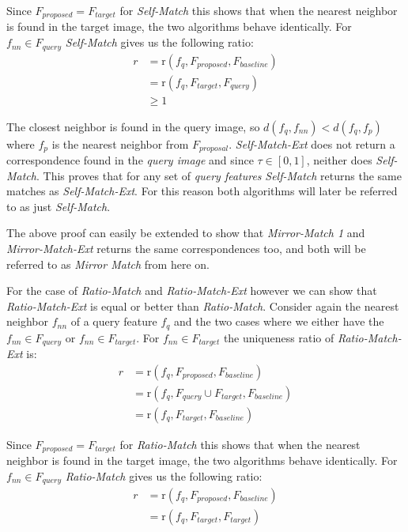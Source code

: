 \documentclass[journal]{IEEEtran}
\begin{document}
Since $F_{proposed} = F_{target}$ for \emph{Self-Match} this shows that
when the nearest neighbor is found in the target image, the two 
algorithms behave identically. For $f_{nn} \in F_{query}$ 
\emph{Self-Match} gives us the following ratio:
\begin{align*}
    r &= \text{r}(f_{q}, F_{proposed}, F_{baseline}) \\
        &= \text{r}(f_{q}, F_{target}, F_{query}) \\
        &\geq 1
\end{align*}

The closest neighbor is found in the query image, so $d(f_{q}, f_{nn}) < 
d(f_{q},f_{p})$ where $f_{p}$ is the nearest neighbor from 
$F_{proposal}$. \emph{Self-Match-Ext} does not return a correspondence 
found in the \emph{query image} and since $\tau \in [0,1]$, neither does 
\emph{Self-Match}. This proves that for any set of \emph{query features} 
\emph{Self-Match} returns the same matches as \emph{Self-Match-Ext}. For 
this reason both algorithms will later be referred to as just 
\emph{Self-Match}.

The above proof can easily be extended to show that \emph{Mirror-Match 
1} and \emph{Mirror-Match-Ext} returns the same correspondences too, and 
both will be referred to as \emph{Mirror Match} from here on.

For the case of \emph{Ratio-Match} and \emph{Ratio-Match-Ext} however we 
can show that \emph{Ratio-Match-Ext} is equal or better than 
\emph{Ratio-Match}.  Consider again the nearest neighbor $f_{nn}$ of a 
query feature $f_{q}$ and the two cases where we either have the $f_{nn} 
\in F_{query}$ or $f_{nn} \in F_{target}$. For $f_{nn} \in F_{target}$ 
the uniqueness ratio of \emph{Ratio-Match-Ext} is:
\begin{align*}
    r &= \text{r}(f_{q}, F_{proposed}, F_{baseline}) \\
        &= \text{r}(f_{q}, F_{query} \cup F_{target}, F_{baseline})\\
        &= \text{r}(f_{q}, F_{target}, F_{baseline})
\end{align*}

Since $F_{proposed} = F_{target}$ for \emph{Ratio-Match} this shows that
when the nearest neighbor is found in the target image, the two 
algorithms behave identically. For $f_{nn} \in F_{query}$ 
\emph{Ratio-Match} gives us the following ratio:
\begin{align*}
    r &= \text{r}(f_{q}, F_{proposed}, F_{baseline}) \\
        &= \text{r}(f_{q}, F_{target}, F_{target})
\end{align*}
\end{document}
